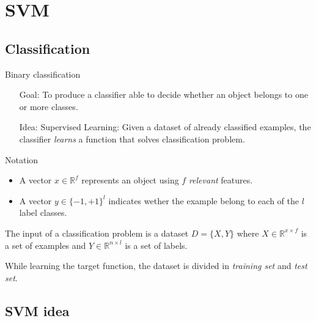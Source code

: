 \section{SVM}
\subsection{Classification}
\begin{frame}{Binary classification}
	\begin{itemize}\setlength\itemsep{1em}
		\item[Goal:] To produce a classifier able to decide whether an object belongs to one or more classes.
		\item[Idea:] Supervised Learning: Given a dataset of already classified examples, the classifier \textit{learns} a function that solves classification problem.
	\end{itemize}
\end{frame}

\begin{frame}{Notation}
	\begin{itemize}\setlength\itemsep{1em}
		\item A vector $x \in \mathbb{R}^f$ represents an object using $f$ \textit{relevant} features.
		\item A vector $y \in \{-1 , +1\}^l$ indicates wether the example belong to each of the $l$ label classes.
	\end{itemize}
	The input of a classification problem is a dataset $D = \{X, Y\}$ where $X \in \mathbb{R}^{x\times f}$ is a set of examples and $Y \in \mathbb{R}^{n\times l}$ is a set of labels.
	
	While learning the target function, the dataset is divided in \textit{training set} and \textit{test set}.
\end{frame}

\subsection{SVM idea}


